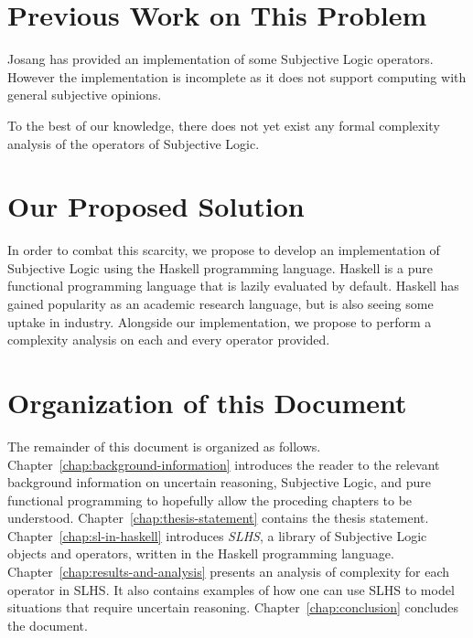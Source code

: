 \documentclass[thesis.tex]{subfiles}
\begin{document}
\section{Previous Work on This Problem}

Josang has provided an implementation of some Subjective Logic operators.
However the implementation is incomplete as it does not support computing
with general subjective opinions.

To the best of our knowledge, there does not yet exist any formal complexity
analysis of the operators of Subjective Logic.


\section{Our Proposed Solution}

In order to combat this scarcity, we propose to develop an implementation
of Subjective Logic using the Haskell programming language. Haskell is
a pure functional programming language that is lazily evaluated by default.
Haskell has gained popularity as an academic research language, but is also
seeing some uptake in industry. Alongside our implementation, we propose to
perform a complexity analysis on each and every operator provided.


\section{Organization of this Document}

The remainder of this document is organized as follows.
Chapter~\ref{chap:background-information}
introduces the reader to the relevant background information on uncertain reasoning,
Subjective Logic, and pure functional programming to hopefully allow the proceding
chapters to be understood. Chapter~\ref{chap:thesis-statement} contains the thesis
statement. Chapter~\ref{chap:sl-in-haskell} introduces \emph{SLHS}, a library of
Subjective Logic objects and operators, written in the Haskell programming language.
Chapter~\ref{chap:results-and-analysis} presents an analysis of complexity for each
operator in SLHS. It also contains examples of how one can use SLHS to model situations
that require uncertain reasoning. Chapter~\ref{chap:conclusion} concludes the document.
\end{document}
